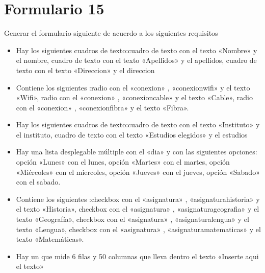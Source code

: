 \documentclass[letterpaper,10pt,spanish]{sphinxmanual}
\begin{document}
\section{Formulario 15}
\label{\detokenize{ejercicios/formularios/anexo_formularios:formulario-15}}
Generar el formulario siguiente de acuerdo a los siguientes requisitos
\begin{itemize}
\item {} 
Hay los siguientes cuadros de texto:cuadro de texto con el texto «Nombre» y el  nombre, cuadro de texto con el texto «Apellidos» y el  apellidos, cuadro de texto con el texto «Direccion» y el  direccion

\item {} 
Contiene los siguientes :radio con el   «conexion» ,   «conexionwifi»  y el texto «Wifi», radio con el   «conexion» ,   «conexioncable»  y el texto «Cable», radio con el   «conexion» ,   «conexionfibra»  y el texto «Fibra».

\item {} 
Hay los siguientes cuadros de texto:cuadro de texto con el texto «Instituto» y el  instituto, cuadro de texto con el texto «Estudios elegidos» y el  estudios

\item {} 
Hay una lista desplegable múltiple con el  «dia» y con las siguientes opciones: opción «Lunes» con el  lunes, opción «Martes» con el  martes, opción «Miércoles» con el  miercoles, opción «Jueves» con el  jueves, opción «Sabado» con el  sabado.

\item {} 
Contiene los siguientes :checkbox con el   «asignatura» ,   «asignaturahistoria»  y el texto «Historia», checkbox con el   «asignatura» ,   «asignaturageografia»  y el texto «Geografía», checkbox con el   «asignatura» ,   «asignaturalengua»  y el texto «Lengua», checkbox con el   «asignatura» ,   «asignaturamatematicas»  y el texto «Matemáticas».

\item {} 
Hay un  que mide 6 filas y 50 columnas que lleva dentro el texto «Inserte aqui el texto»

\end{itemize}
\end{document}
